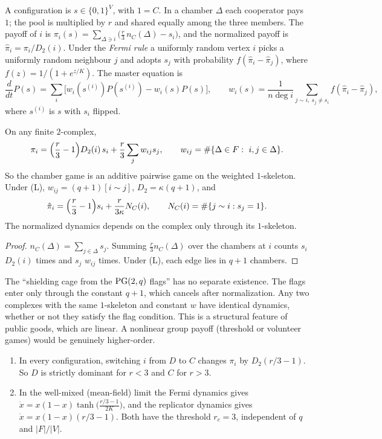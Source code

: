 \begin{definition}\label{V3P5:def:pgg}
A configuration is $s\in\{0,1\}^{V}$, with $1=C$. In a chamber $\Delta$ each cooperator pays
$1$; the pool is multiplied by $r$ and shared equally among the three members. The payoff of
$i$ is
$\pi_i(s)=\sum_{\Delta\ni i}\bigl(\frac r3\,n_C(\Delta)-s_i\bigr)$, and the normalized payoff is
$\hat\pi_i=\pi_i/D_2(i)$. Under the \emph{Fermi rule} \cite{ST98} a uniformly random vertex $i$
picks a uniformly random neighbour $j$ and adopts $s_j$ with probability
$f(\hat\pi_i-\hat\pi_j)$, where $f(z)=1/(1+e^{z/K})$. The master equation is
\[
\frac{d}{dt}P(s)=\sum_{i}\bigl[w_i(s^{(i)})P(s^{(i)})-w_i(s)P(s)\bigr],\qquad
w_i(s)=\frac1{n\deg i}\sum_{j\sim i,\ s_j\ne s_i}f(\hat\pi_i-\hat\pi_j),
\]
where $s^{(i)}$ is $s$ with $s_i$ flipped.
\end{definition}

\begin{theorem}\label{V3P5:thm:reduction}
On any finite $2$-complex,
\[
\pi_i=\Bigl(\frac r3-1\Bigr)D_2(i)\,s_i+\frac r3\sum_{j}w_{ij}s_j,\qquad w_{ij}=\#\{\Delta\in F:\ i,j\in\Delta\}.
\]
So the chamber game is an additive pairwise game on the weighted $1$-skeleton. Under (L),
$w_{ij}=(q+1)[i\sim j]$, $D_2=\kappa(q+1)$, and
\[
\hat\pi_i=\Bigl(\frac r3-1\Bigr)s_i+\frac{r}{3\kappa}N_C(i),\qquad N_C(i)=\#\{j\sim i:s_j=1\}.
\]
The normalized dynamics depends on the complex only through its $1$-skeleton.
\end{theorem}

\begin{proof}
$n_C(\Delta)=\sum_{j\in\Delta}s_j$. Summing $\frac r3n_C(\Delta)$ over the chambers at $i$
counts $s_i$ $D_2(i)$ times and $s_j$ $w_{ij}$ times. Under (L), each edge lies in $q+1$
chambers.
\end{proof}

\begin{remark}\label{V3P5:rem:noflags}
The ``shielding cage from the $\mathrm{PG}(2,q)$ flags'' has no separate existence. The flags enter
only through the constant $q+1$, which cancels after normalization. Any two complexes with the
same $1$-skeleton and constant $w$ have identical dynamics, whether or not they satisfy the
flag condition. This is a structural feature of public goods, which are linear. A nonlinear
group payoff (threshold or volunteer games) would be genuinely higher-order.
\end{remark}

\begin{proposition}\label{V3P5:prop:mf}
\begin{enumerate}
\item[(i)] In every configuration, switching $i$ from $D$ to $C$ changes $\pi_i$ by
$D_2(r/3-1)$. So $D$ is strictly dominant for $r<3$ and $C$ for $r>3$.
\item[(ii)] In the well-mixed (mean-field) limit the Fermi dynamics gives
$\dot x=x(1-x)\tanh\bigl(\frac{r/3-1}{2K}\bigr)$, and the replicator dynamics gives
$\dot x=x(1-x)(r/3-1)$. Both have the threshold $r_c=3$, independent of $q$ and $|F|/|V|$.
\end{enumerate}
\end{proposition}

